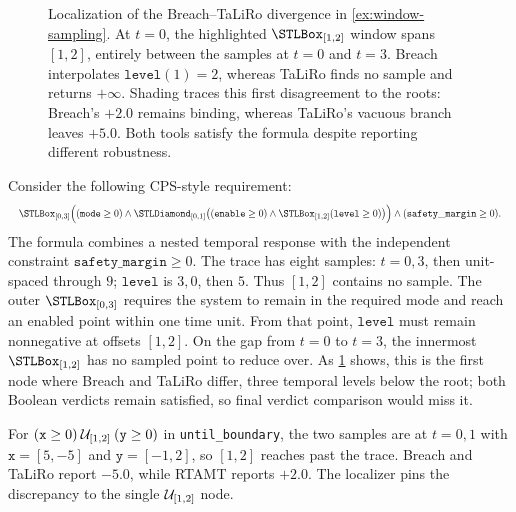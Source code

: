 \begin{figure}[t]
\centering

\caption{Localization of the Breach--TaLiRo divergence in
\cref{ex:window-sampling}. At $t=0$, the highlighted $\Always_{[1,2]}$ window
spans $[1,2]$, entirely between the samples at $t=0$ and $t=3$. Breach
interpolates $\mathtt{level}(1)=2$, whereas TaLiRo finds no sample and returns
$+\infty$. Shading traces this first disagreement to the roots: Breach's $+2.0$
remains binding, whereas TaLiRo's vacuous branch leaves $+5.0$. Both tools
satisfy the formula despite reporting different robustness.}
\label{fig:e2-window-sampling}
\end{figure}

\begin{example}
\label{ex:window-sampling}
Consider the following CPS-style requirement:
\[
  \resizebox{\linewidth}{!}{$\displaystyle
  \Always_{[0,3]}\Bigl((\mathtt{mode} \ge 0) \wedge \Eventually_{[0,1]}\bigl((\mathtt{enable}
  \ge 0) \wedge \Always_{[1,2]}(\mathtt{level} \ge 0)\bigr)\Bigr) \wedge
  (\mathtt{safety\_margin} \ge 0).$}
\]
The formula combines a nested temporal response with the independent constraint
$\mathtt{safety\_margin}\ge0$.
The trace has eight samples: $t=0,3$, then unit-spaced through $9$;
$\mathtt{level}$ is $3,0$, then $5$. Thus $[1,2]$ contains no sample.
The outer $\Always_{[0,3]}$ requires the system to remain in the required mode
and reach an enabled point within one time unit. From that point,
$\mathtt{level}$ must remain nonnegative at offsets $[1,2]$.
On the gap from $t=0$ to $t=3$, the innermost $\Always_{[1,2]}$ has no sampled
point to reduce over. As \cref{fig:e2-window-sampling} shows, this is the first
node where Breach and TaLiRo differ, three temporal levels below the root; both
Boolean verdicts remain satisfied, so final verdict comparison would miss it.
\end{example}

\begin{samepage}
\begin{example}
\label{ex:until-boundary}
For $(\mathtt{x} \ge 0)\mathbin{\mathcal{U}}_{[1,2]}(\mathtt{y} \ge 0)$ in
\texttt{until\_boundary}, the two samples are at $t=0,1$ with
$\mathtt{x}=[5,-5]$ and $\mathtt{y}=[-1,2]$, so $[1,2]$ reaches past the trace.
Breach and TaLiRo report $-5.0$, while RTAMT reports
$+2.0$. The localizer pins the discrepancy to the single $\mathbin{\mathcal{U}}_{[1,2]}$
node.
\end{example}
\end{samepage}

